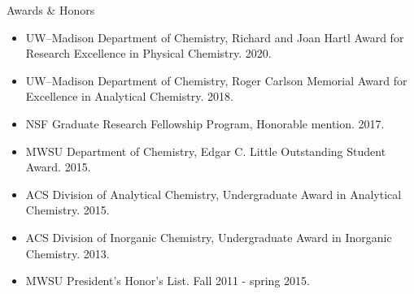 \documentclass{resume} %
\begin{document}
\pagebreak
\begin{rSection}{Awards \& Honors}

\begin{itemize}[leftmargin = 0 pt]
	\item UW--Madison Department of Chemistry, Richard and Joan Hartl Award for Research Excellence in Physical Chemistry. 2020.
	\item UW--Madison Department of Chemistry, Roger Carlson Memorial Award for Excellence in Analytical Chemistry. 2018.
	\item NSF Graduate Research Fellowship Program, Honorable mention. 2017.
	\item MWSU Department of Chemistry, Edgar C. Little Outstanding Student Award. 2015.
	\item ACS Division of Analytical Chemistry, Undergraduate Award in Analytical Chemistry. 2015. 
	\item ACS Division of Inorganic Chemistry, Undergraduate Award in Inorganic Chemistry. 2013.
	\item MWSU President’s Honor’s List. Fall 2011 - spring 2015.
\end{itemize}

\end{rSection}




\end{document}
